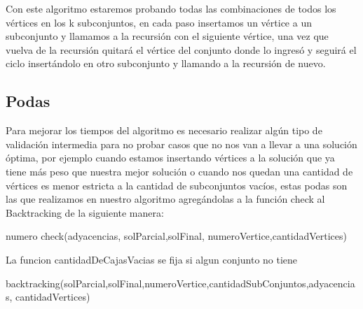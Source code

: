 Con este algoritmo estaremos probando todas las combinaciones de todos los vértices en los k subconjuntos, en cada paso insertamos un vértice a un subconjunto y llamamos a la recursión con el siguiente vértice, una vez que vuelva de la recursión quitará el vértice del conjunto donde lo ingresó y seguirá el ciclo insertándolo en otro subconjunto y llamando a la recursión de nuevo.

\subsection{Podas}
Para mejorar los tiempos del algoritmo es necesario realizar algún tipo de validación intermedia para no probar casos que no nos van a llevar a una solución óptima, por ejemplo cuando estamos insertando vértices a la solución que ya tiene más peso que nuestra mejor solución o cuando nos quedan una cantidad de vértices es menor estricta a la cantidad de subconjuntos vacíos, estas podas son las que realizamos en nuestro algoritmo agregándolas a la función check al Backtracking de la siguiente manera:

\begin{algorithm}
  \begin{algorithmic}[1]\parskip=1mm
 \caption{numero check(adyacencias, solParcial,solFinal, numeroVertice,cantidadVertices)}
  \end{algorithmic}
  \end{algorithm}
La funcion cantidadDeCajasVacias se fija si algun conjunto no tiene  
 
 \begin{algorithm}
 \begin{algorithmic}[1]\parskip=1mm
 \caption{backtracking(solParcial,solFinal,numeroVertice,cantidadSubConjuntos,adyacencias, cantidadVertices)}
  \end{algorithmic}
  \end{algorithm}

